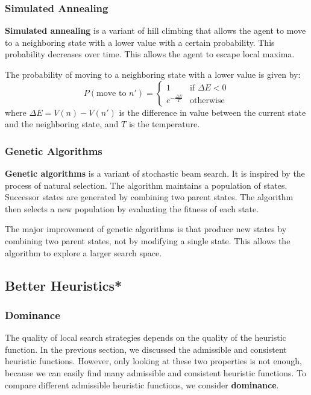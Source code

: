 \documentclass[a4paper,12pt]{article}
\begin{document}
\subsubsection{Simulated Annealing}

\textbf{Simulated annealing} is a variant of hill climbing that allows the agent to move to a neighboring state with a lower value with a certain probability. This probability decreases over time. This allows the agent to escape local maxima.

The probability of moving to a neighboring state with a lower value is given by:
\begin{equation*}
  P(\text{move to } n') = \begin{cases}
    1 & \text{if } \Delta E < 0 \\
    e^{-\frac{\Delta E}{T}} & \text{otherwise}
  \end{cases}
\end{equation*}
where $\Delta E = V(n) - V(n')$ is the difference in value between the current state and the neighboring state, and $T$ is the temperature.

\subsubsection{Genetic Algorithms}

\textbf{Genetic algorithms} is a variant of stochastic beam search. It is inspired by the process of natural selection. The algorithm maintains a population of states. Successor states are generated by combining two parent states. The algorithm then selects a new population by evaluating the fitness of each state.

The major improvement of genetic algorithms is that produce new states by combining two parent states, not by modifying a single state. This allows the algorithm to explore a larger search space.

\subsection{Better Heuristics*}

\subsubsection{Dominance}

The quality of local search strategies depends on the quality of the heuristic function. In the previous section, we discussed the admissible and consistent heuristic functions. However, only looking at these two properties is not enough, because we can easily find many admissible and consistent heuristic functions. To compare different admissible heuristic functions, we consider \textbf{dominance}.
\end{document}
